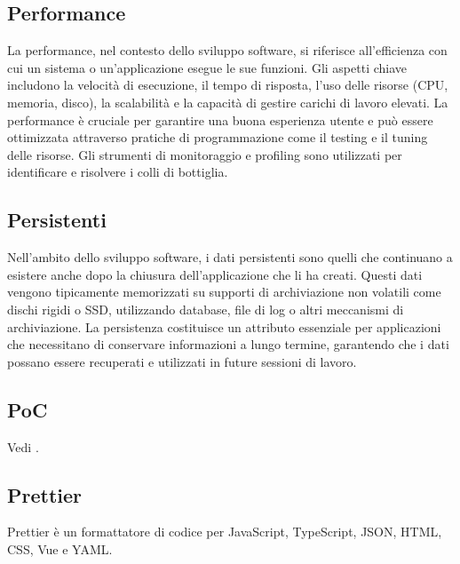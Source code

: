 \vspace{2em}
\subsection*{Performance}
\par La performance, nel contesto dello sviluppo software, si riferisce all'efficienza con cui un sistema o un'applicazione esegue le sue funzioni. Gli aspetti chiave includono la velocità di esecuzione, il tempo di risposta, l'uso delle risorse (CPU, memoria, disco), la scalabilità e la capacità di gestire carichi di lavoro elevati. La performance è cruciale per garantire una buona esperienza utente e può essere ottimizzata attraverso pratiche di programmazione come il testing e il tuning delle risorse. Gli strumenti di monitoraggio e profiling sono utilizzati per identificare e risolvere i colli di bottiglia.

\vspace{2em}
\subsection*{Persistenti}
\par Nell'ambito dello sviluppo software, i dati persistenti sono quelli che continuano a esistere anche dopo la chiusura dell'applicazione che li ha creati. Questi dati vengono tipicamente memorizzati su supporti di archiviazione non volatili come dischi rigidi o SSD, utilizzando database, file di log o altri meccanismi di archiviazione. La persistenza costituisce un attributo essenziale per applicazioni che necessitano di conservare informazioni a lungo termine, garantendo che i dati possano essere recuperati e utilizzati in future sessioni di lavoro.

\vspace{2em}
\subsection*{PoC}
\par Vedi .

\vspace{2em}
\subsection*{Prettier}
\par Prettier è un formattatore di codice per JavaScript, TypeScript, JSON, HTML, CSS, Vue e YAML.

\vspace{2em}
